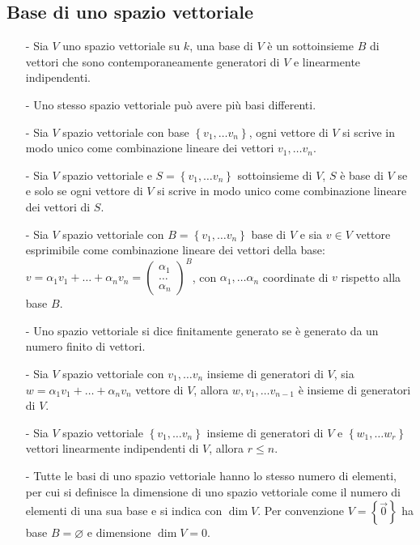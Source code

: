 \documentclass[a4paper]{article}
\newcommand\psmatrix[3]{\left( \begin{smallmatrix} {#1} \\ {#2} \\ {#3} \end{smallmatrix} \right)}
\begin{document}
\subsection{Base di uno spazio vettoriale}
\begin{itemize}
	\item[-] Sia \(V\) uno spazio vettoriale su \(k\), una base di \(V\) è un sottoinsieme \(B\) di vettori che sono contemporaneamente
	generatori di \(V\) e linearmente indipendenti.
	
	\item[-] Uno stesso spazio vettoriale può avere più basi differenti.
	
	\item[-] Sia \(V\) spazio vettoriale con base \(\left\{ v_1, \dots v_n \right\}\), ogni vettore di \(V\) si scrive in modo
	unico come combinazione lineare dei vettori \(v_1, \dots v_n\).
	
	\item[-] Sia \(V\) spazio vettoriale e \(S = \left\{ v_1, \dots v_n \right\}\) sottoinsieme di \(V\), \(S\) è base di \(V\)
	se e solo se ogni vettore di \(V\) si scrive in modo unico come combinazione lineare dei vettori di \(S\).
	
	\item[-] Sia \(V\) spazio vettoriale con \(B = \left\{ v_1, \dots v_n \right\}\) base di \(V\) e sia \(v \in V\) vettore
	esprimibile come combinazione lineare dei vettori della base: \(v = \alpha_1 v_1 + \dots + \alpha_n v_n = \psmatrix{\alpha_1}{\dots}{\alpha_n}^B\),
	con \(\alpha_1, \dots \alpha_n\) coordinate di \(v\) rispetto alla base \(B\).
	
	\item[-] Uno spazio vettoriale si dice finitamente generato se è generato da un numero finito di vettori.
	
	\item[-] Sia \(V\) spazio vettoriale con \(v_1, \dots v_n\) insieme di generatori di \(V\), sia \(w = \alpha_1 v_1 + \dots + \alpha_n v_n\)
	vettore di \(V\), allora \(w, v_1, \dots v_{n-1}\) è insieme di generatori di \(V\).
	
	\item[-] Sia \(V\) spazio vettoriale \(\left\{ v_1, \dots v_n \right\}\) insieme di generatori di \(V\) e \(\left\{ w_1, \dots w_r \right\}\)
	vettori linearmente indipendenti di \(V\), allora \(r \leq n\).
	
	\item[-] Tutte le basi di uno spazio vettoriale hanno lo stesso numero di elementi, per cui si definisce la dimensione di uno
	spazio vettoriale come il numero di elementi di una sua base e si indica con \(\dim V\). Per convenzione \(V = \left\{ \vec{0} \right\}\)
	ha base \(B = \varnothing\) e dimensione \(\dim V = 0\).
	

\end{itemize}
\end{document}
